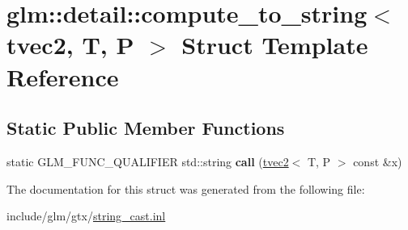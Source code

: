 \hypertarget{structglm_1_1detail_1_1compute__to__string_3_01tvec2_00_01T_00_01P_01_4}{}\section{glm\+:\+:detail\+:\+:compute\+\_\+to\+\_\+string$<$ tvec2, T, P $>$ Struct Template Reference}
\label{structglm_1_1detail_1_1compute__to__string_3_01tvec2_00_01T_00_01P_01_4}
\subsection*{Static Public Member Functions}
\begin{DoxyCompactItemize}
\item 
\mbox{\label{structglm_1_1detail_1_1compute__to__string_3_01tvec2_00_01T_00_01P_01_4_adf2e2875ee41bafdadd331fe4760e435}} 
static G\+L\+M\+\_\+\+F\+U\+N\+C\+\_\+\+Q\+U\+A\+L\+I\+F\+I\+ER std\+::string {\bfseries call} (\hyperlink{structglm_1_1tvec2}{tvec2}$<$ T, P $>$ const \&x)
\end{DoxyCompactItemize}


The documentation for this struct was generated from the following file\+:\begin{DoxyCompactItemize}
\item 
include/glm/gtx/\hyperlink{string__cast_8inl}{string\+\_\+cast.\+inl}\end{DoxyCompactItemize}
